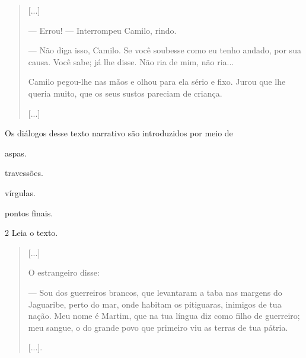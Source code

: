 \begin{quote}
{[}...{]}

--- Errou! --- Interrompeu Camilo, rindo.

--- Não diga isso, Camilo. Se você soubesse como eu tenho andado, por
sua causa. Você sabe; já lhe disse. Não ria de mim, não ria...

Camilo pegou-lhe nas mãos e olhou para ela sério e fixo. Jurou que lhe
queria muito, que os seus sustos pareciam de criança.

{[}...{]}

\end{quote}

Os diálogos desse texto narrativo são introduzidos por meio de

\begin{minipage}{.5\textwidth}
\begin{escolha}
\item aspas.

\item travessões.

\item vírgulas.

\item pontos finais.
\end{escolha}
\end{minipage}

\num{2} Leia o texto.

\begin{quote}
{[}...{]}

O estrangeiro disse:

--- Sou dos guerreiros brancos, que levantaram a taba nas margens do
Jaguaribe, perto do mar, onde habitam os pitiguaras, inimigos de tua
nação. Meu nome é Martim, que na tua língua diz como filho de guerreiro;
meu sangue, o do grande povo que primeiro viu as terras de tua pátria.

{[}...{]}.

\end{quote}

